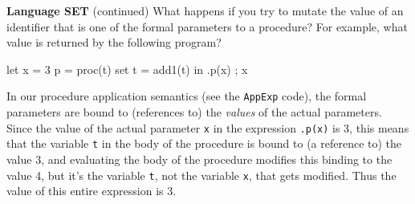 \begin{minipage}[t]{\sw}
\slidenumber
\LARGE
{\bf Language SET} (continued)\exx
What happens if you try to mutate the value
of an identifier that is one of the formal parameters
to a procedure?
For example, what value is returned by the following program?
\begin{qv}
let
  x = 3
  p = proc(t) set t = add1(t)
in
  { .p(x) ; x }
\end{qv}
In our procedure application semantics
(see the \verb'AppExp' code),
the formal parameters are bound
to (references to) the {\em values} of the actual parameters.
Since the value of the actual parameter \verb'x'
in the expression \verb'.p(x)' is 3,
this means that the variable \verb't' in the body of the procedure
is bound to (a reference to) the value 3,
and evaluating the body of the procedure
modifies this binding to the value 4,
but it's the variable \verb't', not the variable \verb'x',
that gets modified.
Thus the value of this entire expression is 3.
\end{minipage}
